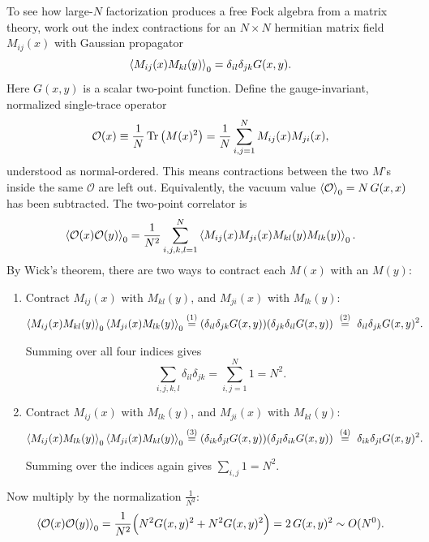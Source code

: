 To see how large-$N$ factorization produces a free Fock algebra from a matrix theory, work out the index
contractions for an $N\times N$ hermitian matrix field $M_{ij}(x)$ with Gaussian propagator
\[
\braket{M_{ij}(x) M_{kl}(y)}_0 = \delta_{il}\delta_{jk} G(x,y) .
\]
Here $G(x,y)$ is a scalar two-point function. Define the gauge-invariant, normalized single-trace operator
\[
\mathcal{O}(x) \equiv \frac{1}{N} \operatorname{Tr}\big(M(x)^2\big) = \frac{1}{N} \sum_{i,j=1}^N M_{ij}(x) M_{ji}(x) ,
\]
understood as normal-ordered. This means contractions between the two $M$'s inside the same $\mathcal O$ are
left out. Equivalently, the vacuum value $\braket{\mathcal O}_0=N\,G(x,x)$ has been subtracted. The two-point
correlator is
\[
\braket{\mathcal{O}(x)\mathcal{O}(y)}_0 = \frac{1}{N^2}\sum_{i,j,k,l=1}^N \braket{M_{ij}(x) M_{ji}(x) M_{kl}(y) M_{lk}(y)}_0 .
\]
By Wick's theorem, there are two ways to contract each $M(x)$ with an $M(y)$:
\begin{enumerate}
\item Contract $M_{ij}(x)$ with $M_{kl}(y)$, and $M_{ji}(x)$ with $M_{lk}(y)$:
\begin{align}
\braket{M_{ij}(x)M_{kl}(y)}_0 \braket{M_{ji}(x)M_{lk}(y)}_0
&\overset{(1)}{=} (\delta_{il}\delta_{jk} G(x,y))(\delta_{jk}\delta_{il} G(x,y))
\ \overset{(2)}{=}\ \delta_{il}\delta_{jk} G(x,y)^2 . \notag
\end{align}
\quad
{}

Summing over all four indices gives
\[
\sum_{i,j,k,l} \delta_{il}\delta_{jk} = \sum_{i,j=1}^N 1 = N^2 .
\]
\item Contract $M_{ij}(x)$ with $M_{lk}(y)$, and $M_{ji}(x)$ with $M_{kl}(y)$:
\begin{align}
\braket{M_{ij}(x)M_{lk}(y)}_0 \braket{M_{ji}(x)M_{kl}(y)}_0
&\overset{(3)}{=} (\delta_{ik}\delta_{jl} G(x,y))(\delta_{jl}\delta_{ik} G(x,y))
\ \overset{(4)}{=}\ \delta_{ik}\delta_{jl} G(x,y)^2 . \notag
\end{align}
\quad
{}

Summing over the indices again gives $\sum_{i,j} 1 = N^2$.
\end{enumerate}
Now multiply by the normalization $\frac{1}{N^2}$:
\[
\braket{\mathcal{O}(x)\mathcal{O}(y)}_0 = \frac{1}{N^2}\Big(N^2 G(x,y)^2 + N^2 G(x,y)^2\Big) = 2\,G(x,y)^2 \sim O(N^0) .
\]

